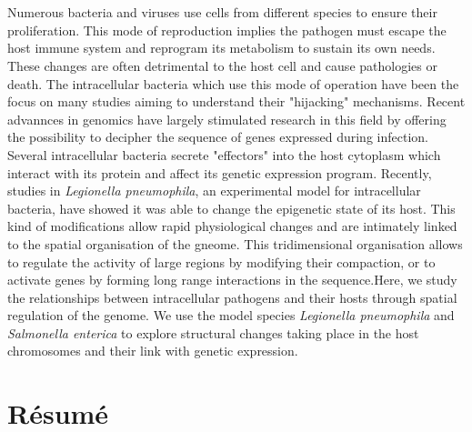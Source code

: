%
\chapter*{\abstractname}
\label{sec:abstract}
\vspace*{-10mm}

Numerous bacteria and viruses use cells from different species to ensure their proliferation. This mode of reproduction implies the pathogen must escape the host immune system and reprogram its metabolism to sustain its own needs. These changes are often detrimental to the host cell and cause pathologies or death. The intracellular bacteria which use this mode of operation have been the focus on many studies aiming to understand their "hijacking" mechanisms. Recent advannces in genomics have largely stimulated research in this field by offering the possibility to decipher the sequence of genes expressed during infection. Several intracellular bacteria secrete "effectors" into the host cytoplasm which interact with its protein and affect its genetic expression program. Recently, studies in \textit{Legionella pneumophila}, an experimental model for intracellular bacteria, have showed it was able to change the epigenetic state of its host. This kind of modifications allow rapid physiological changes and are intimately linked to the spatial organisation of the gneome. This tridimensional organisation allows to regulate the activity of large regions by modifying their compaction, or to activate genes by forming long range interactions in the sequence.Here, we study the relationships between intracellular pathogens and their hosts through spatial regulation of the genome. We use the model species \textit{Legionella pneumophila} and \textit{Salmonella enterica} to explore structural changes taking place in the host chromosomes and their link with genetic expression.

\vspace*{20mm}

\chapter*{Résumé}
\label{sec:abstract-diff}


